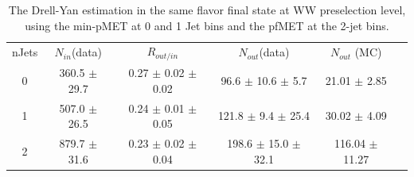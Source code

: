 \begin{table}
\begin{center}
\begin{tabular}{c c c c c c}
\hline
       nJets & $N_{in}$(data)        & $R_{out/in}$        & $N_{out}$(data)  & $N_{out}$ (MC) \\ 
0 & 360.5 $\pm$ 29.7 & 0.27 $\pm$ 0.02 $\pm$ 0.02 & 96.6 $\pm$ 10.6 $\pm$ 5.7 & 21.01 $\pm$ 2.85 \\
1 & 507.0 $\pm$ 26.5 & 0.24 $\pm$ 0.01 $\pm$ 0.05 & 121.8 $\pm$ 9.4 $\pm$ 25.4  & 30.02 $\pm$ 4.09 \\
2 & 879.7 $\pm$ 31.6 & 0.23 $\pm$ 0.02 $\pm$ 0.04 & 198.6 $\pm$ 15.0 $\pm$ 32.1  & 116.04 $\pm$ 11.27 \\
\hline
\end{tabular}
\caption{The Drell-Yan estimation in the same flavor final state at WW preselection level, using the min-pMET at 
0 and 1 Jet bins and the pfMET at the 2-jet bins. }
\label{tab:dy_wwlevel}
\end{center}
\end{table}


